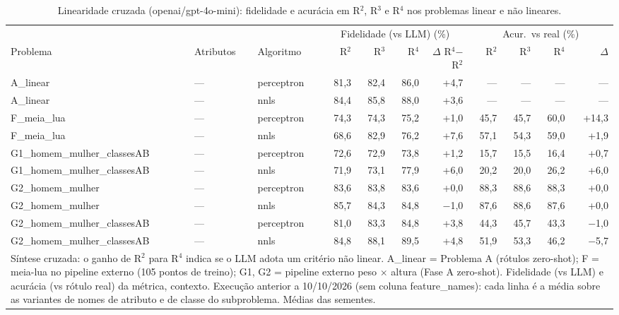 \begin{table}[htbp]
\centering
\footnotesize
\caption{Linearidade cruzada (openai/gpt-4o-mini): fidelidade e acurácia em R$^2$, R$^3$ e R$^4$ nos problemas linear e não lineares.}
\label{tab:final_linearidade_cruzada_R2_R3_R4_gpt4mini}
\begin{tabular}{lllrrrrrrrr}
\toprule
 &  &  & \multicolumn{4}{c}{Fidelidade (vs LLM) (\%)} & \multicolumn{4}{c}{Acur.\ vs real (\%)} \\ \cmidrule(lr){4-7} \cmidrule(lr){8-11}
Problema & Atributos & Algoritmo & R$^2$ & R$^3$ & R$^4$ & $\Delta$ R$^4$$-$R$^2$ & R$^2$ & R$^3$ & R$^4$ & $\Delta$ \\
\midrule
A\_linear & — & perceptron & 81,3 & 82,4 & 86,0 & +4,7 & — & — & — & — \\
A\_linear & — & nnls & 84,4 & 85,8 & 88,0 & +3,6 & — & — & — & — \\
\midrule
F\_meia\_lua & — & perceptron & 74,3 & 74,3 & 75,2 & +1,0 & 45,7 & 45,7 & 60,0 & +14,3 \\
F\_meia\_lua & — & nnls & 68,6 & 82,9 & 76,2 & +7,6 & 57,1 & 54,3 & 59,0 & +1,9 \\
\midrule
G1\_homem\_mulher\_classesAB & — & perceptron & 72,6 & 72,9 & 73,8 & +1,2 & 15,7 & 15,5 & 16,4 & +0,7 \\
G1\_homem\_mulher\_classesAB & — & nnls & 71,9 & 73,1 & 77,9 & +6,0 & 20,2 & 20,0 & 26,2 & +6,0 \\
\midrule
G2\_homem\_mulher & — & perceptron & 83,6 & 83,8 & 83,6 & +0,0 & 88,3 & 88,6 & 88,3 & +0,0 \\
G2\_homem\_mulher & — & nnls & 85,7 & 84,3 & 84,8 & $-$1,0 & 87,6 & 88,6 & 87,6 & +0,0 \\
\midrule
G2\_homem\_mulher\_classesAB & — & perceptron & 81,0 & 83,3 & 84,8 & +3,8 & 44,3 & 45,7 & 43,3 & $-$1,0 \\
G2\_homem\_mulher\_classesAB & — & nnls & 84,8 & 88,1 & 89,5 & +4,8 & 51,9 & 53,3 & 46,2 & $-$5,7 \\
\bottomrule
\multicolumn{11}{p{0.95\linewidth}}{\footnotesize Síntese cruzada: o ganho de R$^2$ para R$^4$ indica se o LLM adota um critério não linear. A\_linear = Problema A (rótulos zero-shot); F = meia-lua no pipeline externo (105 pontos de treino); G1, G2 = pipeline externo peso $\times$ altura (Fase A zero-shot). Fidelidade (vs LLM) e acurácia (vs rótulo real) da métrica, contexto. Execução anterior a 10/10/2026 (sem coluna feature\_names): cada linha é a média sobre as variantes de nomes de atributo e de classe do subproblema. Médias das sementes.} \\
\end{tabular}
\end{table}
